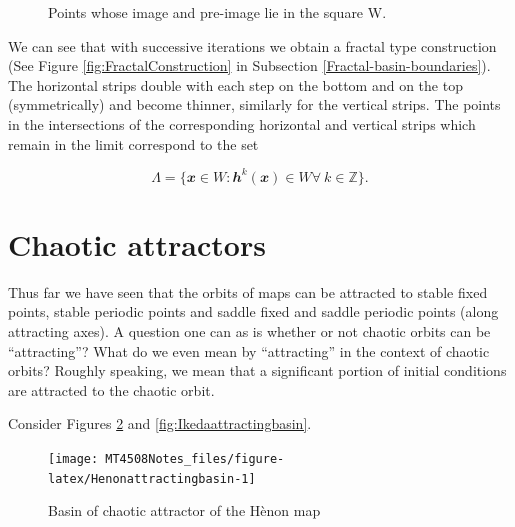 \documentclass[
  a4paper,
  oneside,
  final]{krantz}
\newcommand{\Z}{\mathbb{Z}}
\renewcommand{\v}[1]{{\mathbfit{#1}}}
\theoremstyle{definition}
\theoremstyle{definition}
\theoremstyle{definition}
\theoremstyle{definition}
\theoremstyle{remark}
\begin{document}
\begin{palegreenbox}
\begin{figure}
{}

\caption{Points whose image and pre-image lie in the square W.}\label{fig:horse-shoe-schematic5}
\end{figure}

We can see that with successive iterations we obtain a fractal type construction (See Figure \ref{fig:FractalConstruction} in Subsection \ref{Fractal-basin-boundaries}). The horizontal strips double with each step on the bottom and on the top (symmetrically) and become thinner, similarly for the vertical strips. The points in the intersections of the corresponding horizontal and vertical strips which remain in the limit correspond to the set

\[ \Lambda = \{ \v{x} \in W : \v{h}^{k}(\v{x}) \in W \forall \  k \in \Z\}. \]

\end{palegreenbox}

\hypertarget{Chaotic-attaractors}{%
\section{Chaotic attractors}\label{Chaotic-attaractors}}

Thus far we have seen that the orbits of maps can be attracted to stable fixed points, stable periodic points and saddle fixed and saddle periodic points (along attracting axes). A question one can as is whether or not chaotic orbits can be ``attracting''? What do we even mean by ``attracting'' in the context of chaotic orbits? Roughly speaking, we mean that a significant portion of initial conditions are attracted to the chaotic orbit.

Consider Figures \ref{fig:Henonattractingbasin} and \ref{fig:Ikedaattractingbasin}.

\begin{figure}

{\centering \texttt{[image: MT4508Notes\_files/figure-latex/Henonattractingbasin-1]} 

}

\caption{Basin of chaotic attractor of the Hènon map}\label{fig:Henonattractingbasin}
\end{figure}
\end{document}
